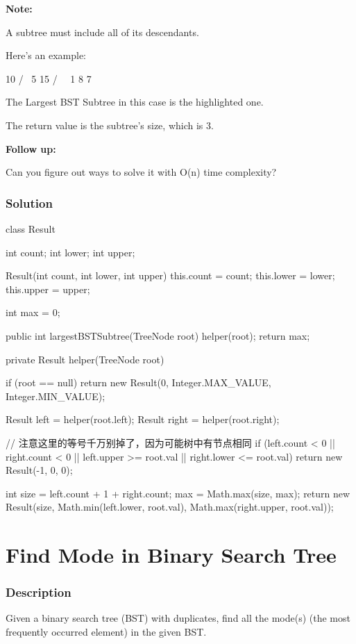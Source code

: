 \textbf{Note:}

A subtree must include all of its descendants.

Here's an example:
\begin{Code}
    10
    / \
   5  15
  / \   \
 1   8   7
\end{Code}

The Largest BST Subtree in this case is the highlighted one.

The return value is the subtree's size, which is 3.

\textbf{Follow up:}

Can you figure out ways to solve it with O(n) time complexity?

\subsubsection{Solution}

\begin{Code}
class Result {
    int count;
    int lower;
    int upper;

    Result(int count, int lower, int upper) {
        this.count = count;
        this.lower = lower;
        this.upper = upper;
    }
}

int max = 0;

public int largestBSTSubtree(TreeNode root) {
    helper(root);
    return max;
}

private Result helper(TreeNode root) {
    if (root == null) {
        return new Result(0, Integer.MAX_VALUE, Integer.MIN_VALUE);
    }

    Result left = helper(root.left);
    Result right = helper(root.right);

    // 注意这里的等号千万别掉了，因为可能树中有节点相同
    if (left.count < 0 || right.count < 0 || left.upper >= root.val || right.lower <= root.val) {
        return new Result(-1, 0, 0);
    }

    int size = left.count + 1 + right.count;
    max = Math.max(size, max);
    return new Result(size, Math.min(left.lower, root.val), Math.max(right.upper, root.val));
}
\end{Code}

\newpage

\section{Find Mode in Binary Search Tree} %

\subsubsection{Description}
Given a binary search tree (BST) with duplicates, find all the mode(s) (the most frequently occurred element) in the given BST.

